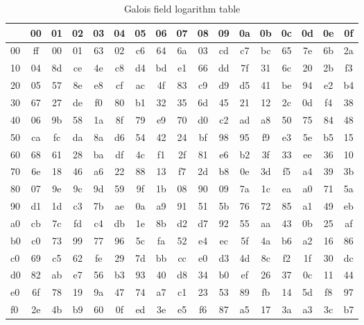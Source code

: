 \begin{table}
\begin{center}
\begin{tabular}{|l||c|c|c|c|c|c|c|c|c|c|c|c|c|c|c|c|}
\hline
&  00 & 01 & 02 & 03 & 04 & 05 & 06 & 07 & 08 & 09 & 0a & 0b & 0c & 0d & 0e & 0f \\
\hline
\hline
00 &  ff & 00 & 01 & 63 & 02 & c6 & 64 & 6a & 03 & cd & c7 & bc & 65 & 7e & 6b & 2a \\
\hline
10 &  04 & 8d & ce & 4e & c8 & d4 & bd & e1 & 66 & dd & 7f & 31 & 6c & 20 & 2b & f3 \\
\hline
20 &  05 & 57 & 8e & e8 & cf & ac & 4f & 83 & c9 & d9 & d5 & 41 & be & 94 & e2 & b4 \\
\hline
30 &  67 & 27 & de & f0 & 80 & b1 & 32 & 35 & 6d & 45 & 21 & 12 & 2c & 0d & f4 & 38 \\
\hline
40 &  06 & 9b & 58 & 1a & 8f & 79 & e9 & 70 & d0 & c2 & ad & a8 & 50 & 75 & 84 & 48 \\
\hline
50 &  ca & fc & da & 8a & d6 & 54 & 42 & 24 & bf & 98 & 95 & f9 & e3 & 5e & b5 & 15 \\
\hline
60 &  68 & 61 & 28 & ba & df & 4c & f1 & 2f & 81 & e6 & b2 & 3f & 33 & ee & 36 & 10 \\
\hline
70 &  6e & 18 & 46 & a6 & 22 & 88 & 13 & f7 & 2d & b8 & 0e & 3d & f5 & a4 & 39 & 3b \\
\hline
80 &  07 & 9e & 9c & 9d & 59 & 9f & 1b & 08 & 90 & 09 & 7a & 1c & ea & a0 & 71 & 5a \\
\hline
90 &  d1 & 1d & c3 & 7b & ae & 0a & a9 & 91 & 51 & 5b & 76 & 72 & 85 & a1 & 49 & eb \\
\hline
a0 &  cb & 7c & fd & c4 & db & 1e & 8b & d2 & d7 & 92 & 55 & aa & 43 & 0b & 25 & af \\
\hline
b0 &  c0 & 73 & 99 & 77 & 96 & 5c & fa & 52 & e4 & ec & 5f & 4a & b6 & a2 & 16 & 86 \\
\hline
c0 &  69 & c5 & 62 & fe & 29 & 7d & bb & cc & e0 & d3 & 4d & 8c & f2 & 1f & 30 & dc \\
\hline
d0 &  82 & ab & e7 & 56 & b3 & 93 & 40 & d8 & 34 & b0 & ef & 26 & 37 & 0c & 11 & 44 \\
\hline
e0 &  6f & 78 & 19 & 9a & 47 & 74 & a7 & c1 & 23 & 53 & 89 & fb & 14 & 5d & f8 & 97 \\
\hline
f0 &  2e & 4b & b9 & 60 & 0f & ed & 3e & e5 & f6 & 87 & a5 & 17 & 3a & a3 & 3c & b7 \\
\hline
\end{tabular}
\end{center}
\caption{Galois field logarithm table}
\label{log-table}
\end{table}

